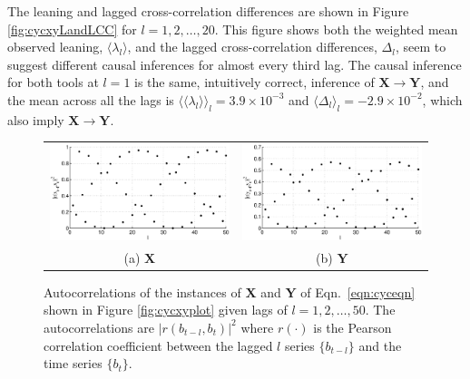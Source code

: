 \documentclass{article}[10pt]
\begin{document}
The leaning and lagged cross-correlation differences are shown in Figure \ref{fig:cycxyLandLCC} for $l=1,2,\ldots,20$.  This figure shows both the weighted mean observed leaning, $\langle \lambda_l\rangle$, and the lagged cross-correlation differences, $\Delta_l$, seem to suggest different causal inferences for almost every third lag.  The causal inference for both tools at $l=1$ is the same, intuitively correct, inference of $\mathbf{X}\rightarrow\mathbf{Y}$, and the mean across all the lags is $\langle\langle\lambda_l\rangle\rangle_l=3.9\times 10^{-3}$ and $\langle\Delta_l\rangle_l=-2.9\times 10^{-2}$, which also imply $\mathbf{X}\rightarrow\mathbf{Y}$.  
\begin{figure}[ht]
\begin{tabular}{cc}
\includegraphics[scale=0.48]{NoisyCyclicResponseExample_autocorrX.eps} & \includegraphics[scale=0.48]{NoisyCyclicResponseExample_autocorrY.eps} \\
(a) $\mathbf{X}$ & (b) $\mathbf{Y}$
\end{tabular}
\caption{Autocorrelations of the instances of $\mathbf{X}$ and $\mathbf{Y}$ of Eqn.\ \ref{eqn:cyceqn} shown in Figure \ref{fig:cycxyplot} given lags of $l=1,2,\ldots,50$.  The autocorrelations are $|r(b_{t-l},b_t)|^2$ where $r(\cdot)$ is the Pearson correlation coefficient between the lagged $l$ series $\{b_{t-l}\}$ and the time series $\{b_{t}\}$.}
\label{fig:cycxyautocorr}
\end{figure}
\end{document}

